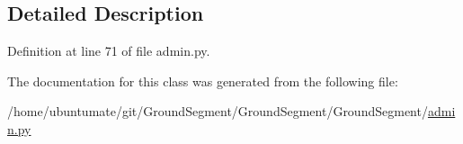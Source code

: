 \subsection{Detailed Description}


Definition at line 71 of file admin.\+py.



The documentation for this class was generated from the following file\+:\begin{DoxyCompactItemize}
\item 
/home/ubuntumate/git/\+Ground\+Segment/\+Ground\+Segment/\+Ground\+Segment/\hyperlink{admin_8py}{admin.\+py}\end{DoxyCompactItemize}
